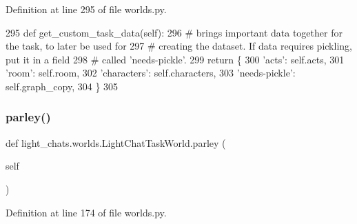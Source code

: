 Definition at line 295 of file worlds.\+py.


\begin{DoxyCode}
295     \textcolor{keyword}{def }get\_custom\_task\_data(self):
296         \textcolor{comment}{# brings important data together for the task, to later be used for}
297         \textcolor{comment}{# creating the dataset. If data requires pickling, put it in a field}
298         \textcolor{comment}{# called 'needs-pickle'.}
299         \textcolor{keywordflow}{return} \{
300             \textcolor{stringliteral}{'acts'}: self.acts,
301             \textcolor{stringliteral}{'room'}: self.room,
302             \textcolor{stringliteral}{'characters'}: self.characters,
303             \textcolor{stringliteral}{'needs-pickle'}: self.graph\_copy,
304         \}
305 \end{DoxyCode}
\mbox{\label{classlight__chats_1_1worlds_1_1LightChatTaskWorld_ab7abcdb2f6a25bd47ec17eb1e31e03cd}} 
\subsubsection{\texorpdfstring{parley()}{parley()}}
{\footnotesize\ttfamily def light\+\_\+chats.\+worlds.\+Light\+Chat\+Task\+World.\+parley (\begin{DoxyParamCaption}\item[{}]{self }\end{DoxyParamCaption})}



Definition at line 174 of file worlds.\+py.


